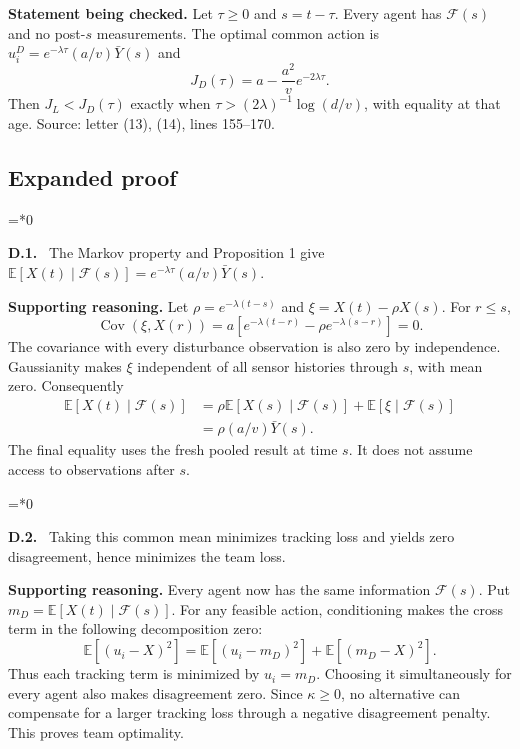\documentclass[12pt,letterpaper]{article}
\newcommand{\E}{\mathbb E}
\newcommand{\Cov}{\operatorname{Cov}}
\newcommand{\F}{\mathcal F}
\newenvironment{proofstep}[2]{%
  \begin{list}{}{\leftmargin=\dimexpr 0.17in*#2\relax%
  \setlength{\rightmargin}{0pt}\setlength{\topsep}{5pt}\setlength{\parsep}{2pt}}%
  \item[]\textbf{\textcolor{ink}{#1.}}\ }{\end{list}}
\begin{document}
\textbf{Statement being checked.}
Let $\tau\ge0$ and $s=t-\tau$. Every agent has $\mathcal F(s)$ and no post-$s$ measurements. The optimal common action is $u_i^D=e^{-\lambda\tau}(a/v)\bar Y(s)$ and
\[
J_D(\tau)=a-\frac{a^2}{v}e^{-2\lambda\tau}.
\]
Then $J_L<J_D(\tau)$ exactly when $\tau>(2\lambda)^{-1}\log(d/v)$, with equality at that age.
\noindent Source: letter (13), (14), lines 155--170.

\subsection*{Expanded proof}

\begin{proofstep}{D.1}{0}
\label{step:D.1}
The Markov property and Proposition 1 give $\E[X(t)\mid\mathcal F(s)]=e^{-\lambda\tau}(a/v)\bar Y(s)$.

\textbf{Supporting reasoning.}
Let $\rho=e^{-\lambda(t-s)}$ and $\xi=X(t)-\rho X(s)$. For $r\le s$,
\[
\Cov(\xi,X(r))=a[e^{-\lambda(t-r)}-\rho e^{-\lambda(s-r)}]=0.
\]
The covariance with every disturbance observation is also zero by independence. Gaussianity makes $\xi$ independent of all sensor histories through $s$, with mean zero. Consequently
\begin{align*}
\E[X(t)\mid\F(s)]
&=\rho\E[X(s)\mid\F(s)]+\E[\xi\mid\F(s)]\\
&=\rho(a/v)\bar Y(s).
\end{align*}
The final equality uses the fresh pooled result at time $s$. It does not assume access to observations after $s$.
\par{}
\end{proofstep}

\begin{proofstep}{D.2}{0}
\label{step:D.2}
Taking this common mean minimizes tracking loss and yields zero disagreement, hence minimizes the team loss.

\textbf{Supporting reasoning.}
Every agent now has the same information $\F(s)$. Put $m_D=\E[X(t)\mid\F(s)]$. For any feasible action, conditioning makes the cross term in the following decomposition zero:
\[
\E[(u_i-X)^2]=\E[(u_i-m_D)^2]+\E[(m_D-X)^2].
\]
Thus each tracking term is minimized by $u_i=m_D$. Choosing it simultaneously for every agent also makes disagreement zero. Since $\kappa\ge0$, no alternative can compensate for a larger tracking loss through a negative disagreement penalty. This proves team optimality.
\par{}
\end{proofstep}
\end{document}
